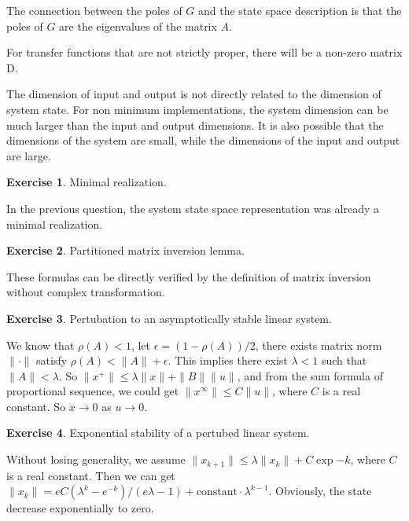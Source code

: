 \documentclass[11pt,a4paper]{report}
\theoremstyle{definition}\newtheorem{exercise}{Exercise}[chapter]
\begin{document}
\begin{answer}
The connection between the poles of $G$ and the state space description is that the poles of $G$ are the eigenvalues of the matrix $A$.

For transfer functions that are not strictly proper, there will be a non-zero matrix D.

The dimension of input and output is not directly related to the dimension of system state. For non minimum implementations, the system dimension can be much larger than the input and output dimensions. It is also possible that the dimensions of the system are small, while the dimensions of the input and output are large.
\end{answer}

\begin{exercise}Minimal realization.\\    
\end{exercise}

\begin{answer}
In the previous question, the system state space representation was already a minimal realization.
\end{answer}


\begin{exercise}Partitioned matrix inversion lemma.\\
\end{exercise}

\begin{answer}
    These formulas can be directly verified by the definition of matrix inversion without complex transformation.
\end{answer}

\begin{exercise}Pertubation to an asymptotically stable linear system.\\
\end{exercise}
\begin{answer}
We know that $\rho(A)<1$, let $\epsilon=(1-\rho(A))/2$, there exists matrix norm $\|\cdot\|$ satisfy $\rho(A)<\|A\|+\epsilon$. This implies there exist $\lambda<1$ such that $\|A\|<\lambda$. So $\|x^+\|\leq \lambda \|x\|+\|B\|\|u\|$, and from the sum formula of proportional sequence, we could get $\|x^\infty\|\leq C\|u\|$, where $C$ is a real constant. So  $x\rightarrow 0$ as $u\rightarrow 0$.
\end{answer}

\begin{exercise}Exponential stability of a pertubed linear system.\\
\end{exercise}
\begin{answer}
Without losing generality, we assume $\|x_{k+1}\|\leq \lambda \|x_k\|+C\exp{-k}$, where $C$ is a real constant. Then we can get $\|x_{k}\|=eC\left(\lambda^k-e^{-k}\right)/(e\lambda-1)+\text{constant}\cdot\lambda^{k-1}$. Obviously, the state decrease exponentially to zero.
\end{answer}
\end{document}
